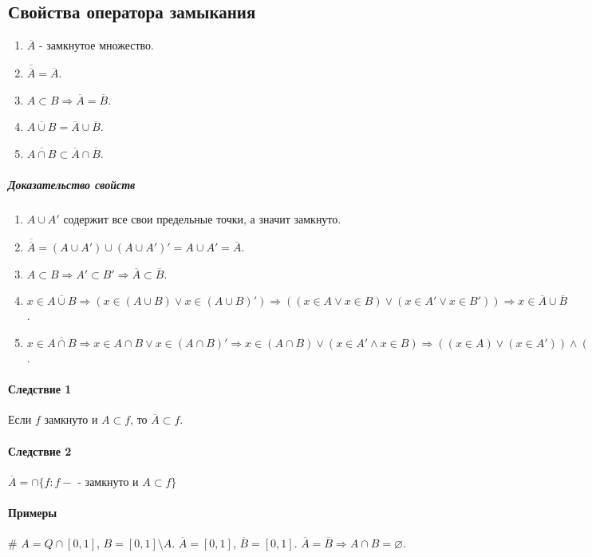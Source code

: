 \documentclass[10pt]{article}
\newcommand{\ol}[1]{\overline{#1}}
\begin{document}
			\subsection{Свойства оператора замыкания}
				\begin{enumerate}
					\item $\ol{A}$ - замкнутое множество.
					\item $\overline{\ol{A}} = \ol{A}$.
					\item $A \subset B \Rightarrow \ol{A} = \ol{B}$.
					\item $\ol{A \cup B} = \ol{A} \cup \ol{B}$.
					\item $\ol{A \cap B} \subset \ol{A} \cap \ol{B}$.
				\end{enumerate}
				
				\subparagraph{Доказательство свойств}
					\begin{enumerate}
						\item $A \cup A'$ содержит все свои предельные точки, а значит замкнуто.
						\item $\overline{\ol{A}} = (A\cup A')\cup(A\cup A')' = A\cup A' = \ol{A}$.
						\item $A\subset B \Rightarrow A'\subset B' \Rightarrow \ol{A} \subset \ol{B}$.
						\item $x \in \ol{A \cup B} \Rightarrow (x \in (A\cup B) \vee x \in (A\cup B)') \Rightarrow ((x \in A \vee x \in B) \vee (x \in A' \vee x \in B')) \Rightarrow x \in \ol{A}\cup\ol{B}$.
						\item $x \in \ol{A \cap B} \Rightarrow x \in A \cap B \vee x \in (A \cap B)' \Rightarrow x \in (A\cap B) \vee (x \in A' \wedge x \in B) \Rightarrow ( (x \in A) \vee (x \in A')) \wedge ((x \in B) \vee x \in B') \Rightarrow x \in \ol{A} \cap \ol{B}$.
					\end{enumerate}
					
				\paragraph{Следствие 1}
					Если $f$ замкнуто и $A \subset f$, то $\ol{A} \subset f$.
				\paragraph{Следствие 2}
					$\ol{A} = \cap\{f : f - $ - замкнуто и $ A\subset f\}$
					
				\paragraph{Примеры} \# $A = Q \cap [0, 1]$, $B = [0, 1] \setminus A$. $\ol{A} = [0, 1]$, $\ol{B} = [0, 1]$. $\ol{A} = \ol{B} \Rightarrow A\cap B = \varnothing$.
				
\end{document}

